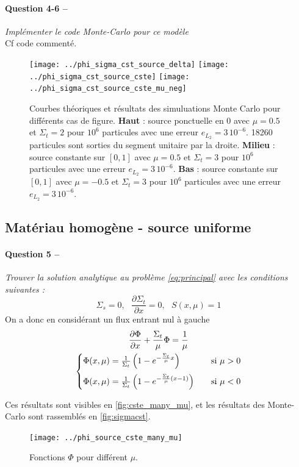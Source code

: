 \documentclass[11pt,a4paper]{article}
\newcommand{\dx}[1]{\dfrac{\partial #1}{\partial x}}
\newcommand{\question}[2]{\paragraph{Question #1 --}\hspace{-7pt}\textit{#2} \\}
\begin{document}
\question{4-6}{Implémenter le code Monte-Carlo pour ce modèle}

Cf code commenté.

\begin{figure}
  \centering
  \texttt{[image: ../phi\_sigma\_cst\_source\_delta]}
  \texttt{[image: ../phi\_sigma\_cst\_source\_cste]}
  \texttt{[image: ../phi\_sigma\_cst\_source\_cste\_mu\_neg]}
  \caption{Courbes théoriques et résultats des simuluations Monte Carlo pour différents cas de figure.
    \textbf{Haut} : source ponctuelle en 0 avec $\mu=0.5$ et $\Sigma_t=2$ pour $10^6$ particules avec une erreur $e_{L_2} = 3\,10^{-6}$. 18260 particules sont sorties du segment unitaire par la droite. 
    \textbf{Milieu} : source constante sur $[0,1]$ avec $\mu=0.5$ et $\Sigma_t=3$ pour $10^6$ particules avec une erreur $e_{L_2} = 3\,10^{-6}$.
    \textbf{Bas} :  source constante sur $[0,1]$ avec $\mu=-0.5$ et $\Sigma_t=3$ pour $10^6$ particules avec une erreur $e_{L_2} = 3\,10^{-6}$.}
  \label{fig:sigmacst}
\end{figure}

\subsection{Matériau homogène - source uniforme}

\question{5}{Trouver la solution analytique au problème \autoref{eq:principal} avec les conditions suivantes :}

\begin{equation}
  \Sigma_s=0, ~~~ \dx{\Sigma_t} = 0, ~~~ S(x, \mu) = 1
\end{equation}
On a donc en considérant un flux entrant nul à gauche 
\begin{gather}
  \dx{\Phi} + \frac{\Sigma_t}{\mu} \Phi = \frac{1}{\mu} \\
  \begin{cases}
    \Phi(x, \mu)= \frac{1}{\Sigma_t}\left( 1-e^{-\frac{\Sigma_t}{\mu}x}\right) &~~~ \mbox{si } \mu>0 \medskip \\ %
    \Phi(x, \mu)= \frac{1}{\Sigma_t}\left( 1-e^{-\frac{\Sigma_t}{\mu}(x-1)}\right) &~~~ \mbox{si } \mu<0 
  \end{cases}
\end{gather}

Ces résultats sont visibles en \autoref{fig:cste_many_mu}, et les résultats des Monte-Carlo sont rassemblés en \autoref{fig:sigmacst}.
\begin{figure}
  \centering
  \texttt{[image: ../phi\_source\_cste\_many\_mu]}
  \caption{Fonctions $\Phi$ pour différent $\mu$.}
  \label{fig:cste_many_mu}
\end{figure}
\end{document}
